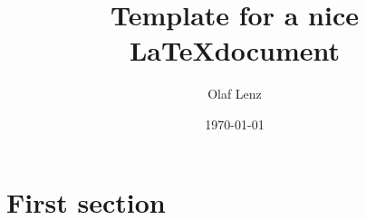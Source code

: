 \documentclass[
a4paper,
11pt,
bibtotoc
]{scrartcl}
\begin{document}
\titlehead{Simulation Methods in Physics I \hfill WS 2012/2013}
\title{Template for a nice \LaTeX document}
\author{Olaf Lenz}
\date{\today}
\publishers{Institute for Computational Physics, University of
  Stuttgart}
\maketitle

\tableofcontents

\section{First section}
\end{document}
